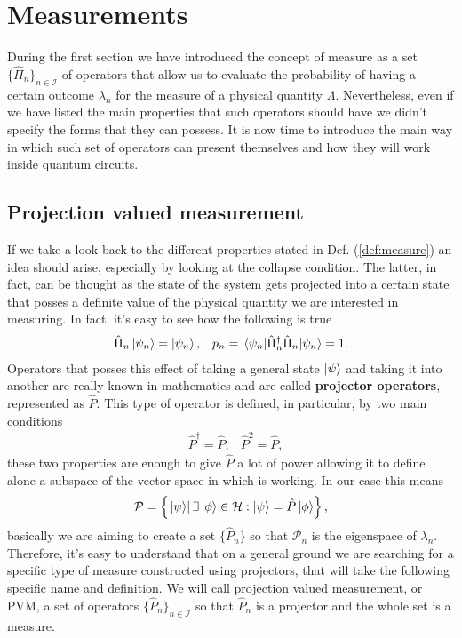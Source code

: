 \section{Measurements}

During the first section we have introduced the concept of measure as a set $\{ \hat{\Pi}_n \}_{n\in\mathcal{I}}$ of operators that allow us to evaluate the probability of having a certain outcome $\lambda_n$ for the measure of a physical quantity $\Lambda$. Nevertheless, even if we have listed the main properties that such operators should have we didn't specify the forms that they can possess. It is now time to introduce the main way in which such set of operators can present themselves and how they will work inside quantum circuits.

\subsection{Projection valued measurement}

If we take a look back to the different properties stated in Def. (\ref{def:measure}) an idea should arise, especially by looking at the collapse condition. The latter, in fact, can be thought as the state of the system gets projected into a certain state that posses a definite value of the physical quantity we are interested in measuring. In fact, it's easy to see how the following is true
\begin{align}
    &\hat{\Pi}_n \ket{\psi_n} = \ket{\psi_n}, &p_n = \ev{\hat{\Pi}_n^\dagger\hat{\Pi}_n}{\psi_n} = 1.
\end{align}
Operators that posses this effect of taking a general state $\ket{\psi}$ and taking it into another are really known in mathematics and are called \textbf{projector operators}, represented as $\hat{P}$. This type of operator is defined, in particular, by two main conditions
\begin{align}
    \label{eq:ProjDef}
    &\hat{P}^\dagger = \hat{P}, & \hat{P}^2 = \hat{P},
\end{align}
these two properties are enough to give $\hat{P}$ a lot of power allowing it to define alone a subspace of the vector space in which is working. In our case this means
\begin{equation}
    \mathcal{P} = \left\{ \left.\ket{\psi}\right| \exists \ket{\phi} \in \mathcal{H}: \ket{\psi} = \hat{P}\ket{\phi} \right\},
\end{equation}
basically we are aiming to create a set $\{ \hat{P}_n \}$ so that $\mathcal{P}_n$ is the eigenspace of $\lambda_n$. Therefore, it's easy to understand that on a general ground we are searching for a specific type of measure constructed using projectors, that will take the following specific name and definition.
{
    We will call projection valued measurement, or PVM, a set of operators $\{ \hat{P}_n \}_{n\in\mathcal{I}}$ so that $\hat{P}_n$ is a projector and the whole set is a measure.
}

